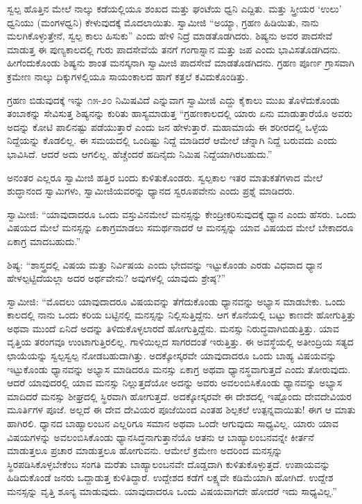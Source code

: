  ಸ್ವಲ್ಪ ಹೊತ್ತಿನ ಮೇಲೆ ನಾಲ್ಕು ಕಡೆಯಲ್ಲಿಯೂ ಶಂಖದ ಮತ್ತು ಘಂಟೆಯ ಧ್ವನಿ ಎದ್ದಿತು. ಮತ್ತು ಸ್ತ್ರೀಯರ ‘ಉಲು’ ಧ್ವನಿಯು (ಮಂಗಳಧ್ವನಿ) ಕೇಳುವುದಕ್ಕೆ ಮೊದಲಾಯಿತು. ಸ್ವಾಮೀಜಿ “ಅಯ್ಯಾ, ಗ್ರಹಣ ಹಿಡಿಯಿತು, ನಾನು ಮಲಗಿಕೊಳ್ಳುತ್ತೇನೆ, ಸ್ವಲ್ಪ ಕಾಲು ಹಿಸುಕು” ಎಂದು ಹೇಳಿ ನಿದ್ರೆ ಮಾಡತೊಡಗಿದರು. ಶಿಷ್ಯನು ಅವರ ಪಾದಸೇವೆ ಮಾಡುತ್ತ ಈ ಪುಣ್ಯಕಾಲದಲ್ಲಿ ಗುರು ಪಾದಸೇವೆಯೆ ತನಗೆ ಗಂಗಾಸ್ನಾನ ಮತ್ತು ಜಪ ಎಂದು ಭಾವಿಸತೊಡಗಿದನು. ಹೀಗೆಂದುಕೊಂಡು ಶಿಷ್ಯನು ಶಾಂತ ಮನಸ್ಕನಾಗಿ ಸ್ವಾಮೀಜಿ ಪಾದಸೇವೆ ಮಾಡತೊಡಗಿದನು. ಗ್ರಹಣ ಪೂರ್ಣ ಗ್ರಾಸವಾಗಿ ಕ್ರಮೇ‌ಣ ನಾಲ್ಕು ದಿಕ್ಕುಗಳಲ್ಲಿಯೂ ಸಾಯಂಕಾಲದ ಹಾಗೆ ಕತ್ತಲೆ ಕವಿದುಕೊಂಡಿತ್ತು. 

ಗ್ರಹಣ ಬಿಡುವುದಕ್ಕೆ ಇನ್ನು ೧೫-೨೦ ನಿಮಿಷವಿದೆ ಎನ್ನುವಾಗ ಸ್ವಾಮೀಜಿ ಎದ್ದು ಕೈಕಾಲು ಮುಖ ತೊಳೆದುಕೊಂಡು ತಂಬಾಕನ್ನು ಸೇವಿಸುತ್ತ ಶಿಷ್ಯನನ್ನು ಕುರಿತು ಹಾಸ್ಯಮಾಡುತ್ತ “ಗ್ರಹಣಕಾಲದಲ್ಲಿ ಯಾರು ಏನು ಮಾಡುತ್ತಾರೆಯೊ ಅವರು ಅದನ್ನು ಕೋಟಿ ಪಾಲಿನಷ್ಟು ಪಡೆಯುತ್ತಾರೆ ಎಂದು ಜನ ಹೇಳುತ್ತಾರೆ. ಮಹಾಮಾಯೆ ಈ ಶರೀರದಲ್ಲಿ ಒಳ್ಳೆಯ ನಿದ್ದೆಯನ್ನು ಕೊಡಲಿಲ್ಲ. ಈ ಸಮಯದಲ್ಲಿ ಒಂದಿಷ್ಟು ನಿದ್ದೆ ಮಾಡಿದರೆ ಆಮೇಲೆ ಚೆನ್ನಾಗಿ ನಿದ್ದೆ ಬರುವದು ಎಂದು ಭಾವಿಸಿದೆ. ಆದರೆ ಅದು ಆಗಲಿಲ್ಲ. ಹೆಚ್ಚೆಂದರೆ ಹದಿನೈದು ನಿಮಿಷ ನಿದ್ದೆಯಾಗಿರಬಹುದು.” 

 ಅನಂತರ ಎಲ್ಲರೂ ಸ್ವಾಮೀಜಿ ಹತ್ತಿರ ಬಂದು ಕುಳಿತುಕೊಂಡರು. ಸ್ವಲ್ಪಕಾಲ ಇತರ ಮಾತುಕತೆಗಳಾದ ಮೇಲೆ ಶುದ್ಧಾನಂದ ಸ್ವಾಮಿಗಳು, ಸ್ವಾಮೀಜಿಯವರನ್ನು ಧ್ಯಾನದ ಸ್ವರೂಪವೇನು ಎಂದು ಪ್ರಶ್ನೆ ಮಾಡಿದರು. 

 ಸ್ವಾಮೀಜಿ: “ಯಾವುದಾದರೂ ಒಂದು ವಸ್ತುವಿನಮೇಲೆ ಮನಸ್ಸನ್ನು ಕೇಂದ್ರೀಕರಿಸುವುದಕ್ಕೆ ಧ್ಯಾನ ಎಂದು ಹೆಸರು. ಒಂದು ವಿಷಯದ ಮೇಲೆ ಮನಸ್ಸನ್ನು ಏಕಾಗ್ರಮಾಡಲು ಸಮರ್ಥನಾದರೆ ಆ ಮನಸ್ಸನ್ನು ಯಾವ ವಿಷಯದ ಮೇಲೆ ಬೇಕಾದರೂ ಏಕಾಗ್ರ ಮಾದಬಹುದು.” 

 ಶಿಷ್ಯ: “ಶಾಸ್ತ್ರದಲ್ಲಿ ವಿಷಯ ಮತ್ತು ನಿರ್ವಿಷಯ ಎಂದು ಭೇದವನ್ನು ಇಟ್ಟುಕೊಂಡು ಎರಡು ವಿಧವಾದ ಧ್ಯಾನ ಹೇಳಲ್ಪಟ್ಟಿದೆಯಲ್ಲಾ ಅದರ ಅರ್ಥವೇನು? ಅವುಗಳಲ್ಲಿ ಯಾವುದು ಶ್ರೇಷ್ಠ?” 

 ಸ್ವಾಮೀಜಿ: “ಮೊದಲು ಯಾವುದಾದರೂ ವಿಷಯವನ್ನು ತೆಗೆದುಕೊಂಡು ಧ್ಯಾನವನ್ನು ಅಭ್ಯಾಸ ಮಾಡಬೇಕು. ಒಂದು ಕಾಲದಲ್ಲಿ ನಾನು ಒಂದು ಕರಿಯ ಬಟ್ಟಿನಲ್ಲಿ ಮನಸ್ಸನ್ನು ನಿಲ್ಲಿಸುತ್ತಿದ್ದೆನು. ಆಗ ಕೊನೆಯಲ್ಲಿ ಬಟ್ಟು ಕಾಣದೇ ಹೋಗುತ್ತಿತ್ತು ಅಥವಾ ಮುಂದೆ ಏನಿದೆ ಅದನ್ನು ತಿಳಿದುಕೊಳ್ಳಲಾರದೆ ಹೋಗುತ್ತಿದ್ದೆನು. ಮನಸ್ಸು ನಿರುದ್ಧವಾಗಿಬಿಡುತ್ತಿತ್ತು. ಯಾವ ವೃತ್ತಿಯ ತರಂಗವೂ ಉಂಟಾಗುತ್ತಿರಲಿಲ್ಲ. ಗಾಳಿಯಿಲ್ಲದ ಸಾಗರದಂತೆ ಇರುತ್ತಿತ್ತು. ಈ ಅವಸ್ಥೆಯಲ್ಲಿ ಅತೀಂದ್ರಿಯ ಸತ್ಯದ ಛಾಯೆಯನ್ನು ಸ್ವಲ್ಪಸ್ವಲ್ಪ ನೋಡಬಹುದಾಗಿತ್ತು. ಅದಕ್ಕೋಸ್ಕರವೇ ಯಾವುದಾದರೂ ಒಂದು ಬಾಹ್ಯ ವಿಷಯವನ್ನು ಇಟ್ಟುಕೊಂಡು ಧ್ಯಾನವನ್ನು ಅಭ್ಯಾಸ ಮಾಡಿದರೂ ಮನಸ್ಸು ಏಕಾಗ್ರ ಅಥವಾ ಧ್ಯಾನಸ್ಥವಾಗುತ್ತದೆ ಎಂದು ತೋರುವುದು. ಆದರೆ ಯಾವುದರಲ್ಲಿ ಯಾವ ಮನಸ್ಸು ನಿಲ್ಲುತ್ತದೆಯೋ ಅದನ್ನು ಅವರು ಅವಲಂಬಿಸಿಕೊಂಡು ಧ್ಯಾನವನ್ನು ಅಭ್ಯಾಸ ಮಾದಿದರೆ ಮನಸ್ಸು ಶೀಘ್ರದಲ್ಲಿ ಸ್ಥಿರವಾಗಿ ಹೋಗುತ್ತದೆ. ಅದಕ್ಕೋಸ್ಕರವೇ ಈ ದೇಶದಲ್ಲಿ ಇಷ್ಟೊಂದು ದೇವದೇವಿಯರ ಮೂರ್ತಿಗಳ ಪೂಜೆ. ಅಲ್ಲದೆ ಈ ದೇವ ದೇವಿಯರ ಪೂಜೆಯಿಂದ ಎಂತಹ ಶಿಲ್ಪಕಲೆ ಉತ್ಪನ್ನವಾಯಿತು! ಈಗ ಆ ಮಾತು ಹಾಗಿರಲಿ. ಧ್ಯಾನದ ಬಾಹ್ಯಾಲಂಬನ ಎಲ್ಲರಿಗೂ ಸಮಾನ ಅಥವಾ ಒಂದೇ ಆಗುವುದು ಸಾಧ್ಯವಿಲ್ಲ. ಯಾರು ಯಾವ ವಿಷಯಗಳನ್ನು ಅವಲಂಬಿಸಿಕೊಂಡು ಧ್ಯಾನಸಿದ್ಧನಾಗುತ್ತಾನೆಯೊ ಆತನು ಆ ಬಾಹ್ಯಾಲಂಬನವನ್ನೇ ಕೀರ್ತನೆ ಮಾಡುತ್ತಲೂ ಪ್ರಚಾರ ಮಾಡುತ್ತಲೂ ಹೋಗುವನು. ಆಮೇಲೆ ಕ್ರಮೇಣ ಅದರಿಂದ ಮನಸ್ಸನ್ನು ಸ್ಥಿರಪಡಿಸಿಕೊಳ್ಳಬೇಕೆಂಬ ಸಂಗತಿ ಮರೆತು ಬಾಹ್ಯಾಲಂಬನವೇ ದೊಡ್ಡದಾಗಿ ಕುಳಿತುಕೊಳ್ಳುತ್ತದೆ. ಉಪಾಯವನ್ನು ಹಿಡಿದುಕೊಂಡೆ ಜನರು ಒದ್ದಾಡುತ್ತ ಕುಳಿತಿದ್ದಾರೆ. ಉದ್ದೇಶದ ಕಡೆಗೆ ಲಕ್ಷ್ಯವೇ ಕಡಿಮೆಯಾಗಿ ಹೋಗಿದೆ. ಉದ್ದೇಶ ಮನಸ್ಸನ್ನು ವೃತ್ತಿ ಶೂನ್ಯ ಮಾಡುವುದು. ಯಾವುದಾದರೂ ಒಂದು ವಿಷಯವಾಗದೇ ಹೋದರೆ ಇದು ಸಾಧ್ಯವಿಲ್ಲ.” 

